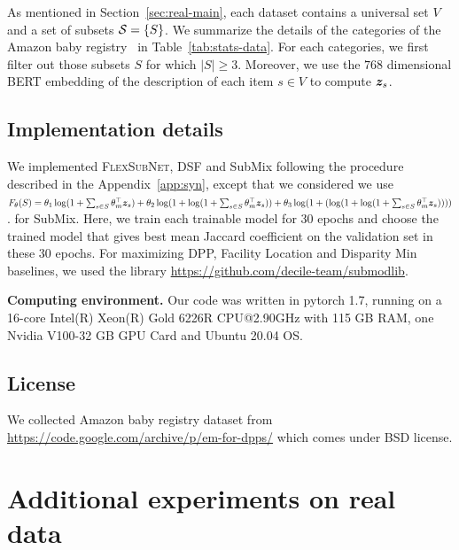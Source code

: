 \documentclass{article}
\newcommand{\our}{\textsc{Flex\-Sub\-Net}}
\newcommand{\xhdr}[1]{\noindent\textbf{#1.}}
\renewcommand{\cite}{\citep}
\begin{document}
As mentioned in Section~\ref{sec:real-main}, each dataset contains a universal set $V$ and a set of subsets ${\mathcal{S}}=\left\{ S\right\}$. We summarize the details of the categories of the Amazon baby registry~\cite{gillenwater2014expectation} in Table~\ref{tab:stats-data}. For each categories, we first filter out those subsets $S$ for which $|S| \ge 3$.  Moreover, we use the $768$ dimensional BERT embedding of the description of each item $s\in V$ to compute $\bm{z}_s$.
\subsection{Implementation details} 
We implemented \our, DSF and SubMix following the procedure
 described in the Appendix~\ref{app:syn}, except that we considered 
 we use 
$F_{\theta}(S) = \theta_1 \log(1+\sum_{s\in S}\theta_m ^\top \bm{z}_s) + \theta_2 \log (1+\log(1+\sum_{s\in S} \theta_m ^\top \bm{z}_s)) + \theta_3 \log(1+( \log (1+\log (1+\sum_{s\in S} \theta_m ^\top \bm{z}_s))))$.
 for SubMix.
  Here, we train each trainable model for 30 epochs and choose the trained model that gives best mean Jaccard coefficient on the validation set in these 30 epochs.
 For maximizing DPP, Facility Location
and Disparity Min baselines, we used the library \url{https://github.com/decile-team/submodlib}.

\xhdr{Computing environment}
Our code was written in pytorch 1.7, running on a 16-core Intel(R) Xeon(R) Gold 6226R CPU@2.90GHz with 115 GB RAM, one Nvidia V100-32 GB GPU Card and Ubuntu 20.04 OS.

\subsection{License}
We collected Amazon baby registry dataset from \url{https://code.google.com/archive/p/em-for-dpps/} which comes under BSD license.
\newpage
%
\section{Additional experiments on real data}
\label{app:addl}

\end{document}
